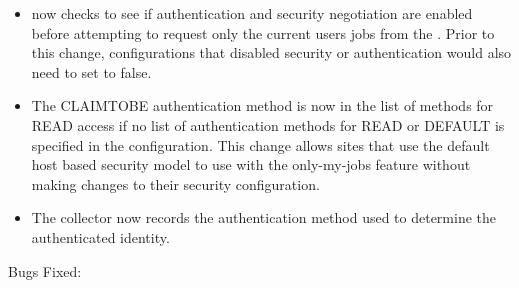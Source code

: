 \begin{itemize}

\item {} now checks to see if authentication and security negotiation are enabled before attempting to
request only the current users jobs from the .  Prior to this change, configurations that disabled
security or authentication would also need to set  to false.

\item The CLAIMTOBE authentication method is now in the list of methods for READ access if no list of
authentication methods for READ or DEFAULT is specified in the configuration.  This change allows sites that
use the default host based security model to use   with the only-my-jobs feature
without making changes to their security configuration.

\item The collector now records the authentication method used to determine the authenticated identity.

\end{itemize}

\noindent Bugs Fixed:


